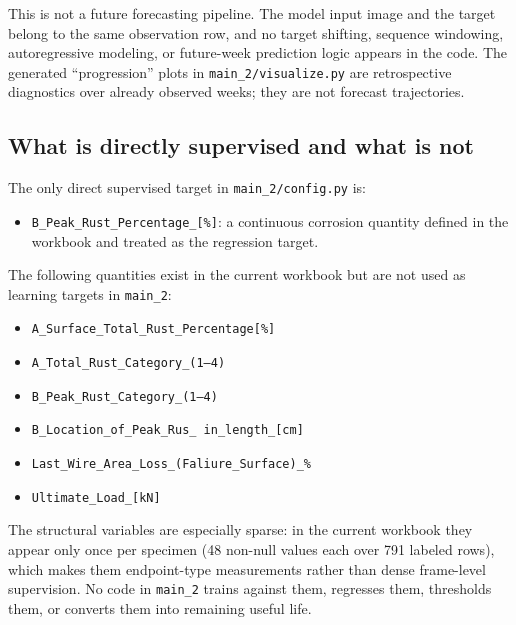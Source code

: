 \documentclass[11pt]{article}
\begin{document}
This is not a future forecasting pipeline. The model input image and the target belong to the same observation row, and no target shifting, sequence windowing, autoregressive modeling, or future-week prediction logic appears in the code. The generated ``progression'' plots in \texttt{main\_2/visualize.py} are retrospective diagnostics over already observed weeks; they are not forecast trajectories.

\subsection{What is directly supervised and what is not}
The only direct supervised target in \texttt{main\_2/config.py} is:
\begin{itemize}
  \item \texttt{B\_Peak\_Rust\_Percentage\_[\%]}: a continuous corrosion quantity defined in the workbook and treated as the regression target.
\end{itemize}

The following quantities exist in the current workbook but are not used as learning targets in \texttt{main\_2}:
\begin{itemize}
  \item \texttt{A\_Surface\_Total\_Rust\_Percentage[\%]}
  \item \texttt{A\_Total\_Rust\_Category\_(1--4)}
  \item \texttt{B\_Peak\_Rust\_Category\_(1--4)}
  \item \texttt{B\_Location\_of\_Peak\_Rus\_\ in\_length\_[cm]}
  \item \texttt{Last\_Wire\_Area\_Loss\_(Faliure\_Surface)\_\%}
  \item \texttt{Ultimate\_Load\_[kN]}
\end{itemize}

The structural variables are especially sparse: in the current workbook they appear only once per specimen (48 non-null values each over 791 labeled rows), which makes them endpoint-type measurements rather than dense frame-level supervision. No code in \texttt{main\_2} trains against them, regresses them, thresholds them, or converts them into remaining useful life.
\end{document}
